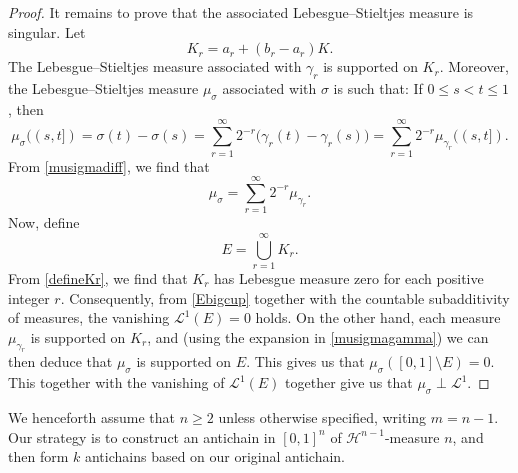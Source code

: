 \documentclass[10pt,a4paper]{amsart}
\begin{document}
\begin{proof}
It remains to prove that the associated Lebesgue--Stieltjes measure is singular. Let
\begin{equation}\label{defineKr} 
K_r=a_r+(b_r-a_r)K.
\end{equation}
The Lebesgue--Stieltjes measure associated with $\gamma_r$ is supported on
 $K_r$. Moreover, 
 the Lebesgue--Stieltjes measure $\mu_\sigma$ associated with
 $\sigma$ is such that: If $0 \leq s < t \leq 1$, then 
\begin{equation}\label{musigmadiff}
 \mu_\sigma((s,t])
=
\sigma(t)-\sigma(s)
=
\sum_{r=1}^{\infty}2^{-r}
\bigl(\gamma_r(t)-\gamma_r(s)\bigr)
=
\sum_{r=1}^{\infty}2^{-r}\mu_{\gamma_r}((s,t]). 
\end{equation}
 From \eqref{musigmadiff}, we find that 
\begin{equation}\label{musigmagamma} 
\mu_\sigma
=
\sum_{r=1}^{\infty}2^{-r}\mu_{\gamma_r}.
\end{equation}
 Now, define 
\begin{equation}\label{Ebigcup}
 E = \bigcup_{r=1}^{\infty}K_r.
\end{equation}
 From \eqref{defineKr}, we find that 
 $K_r$ has Lebesgue measure zero for each positive integer $r$. 
 Consequently, from \eqref{Ebigcup} 
 together with the countable subadditivity of measures, the vanishing 
$ \mathcal L^1(E)=0 
$ holds. On the other hand, each measure \(\mu_{\gamma_r}\) is supported on \(K_r\), and (using the expansion in \eqref{musigmagamma})
 we can then deduce that $\mu_\sigma$ is supported on $E$. This gives us that 
$\mu_\sigma([0,1]\setminus E)=0$. 
 This together with the vanishing of $\mathcal{L}^{1}(E)$ together give us  that $ \mu_\sigma\perp \mathcal L^1$.
\end{proof} 

 We henceforth assume that $n \geq 2$ unless otherwise specified, writing $m = n - 1$. 
 Our strategy is to construct an antichain in $[0, 1]^{n}$ of $\mathcal{H}^{n-1}$-measure $n$, 
 and then form $k$ antichains based on our original antichain. 
\end{document}
